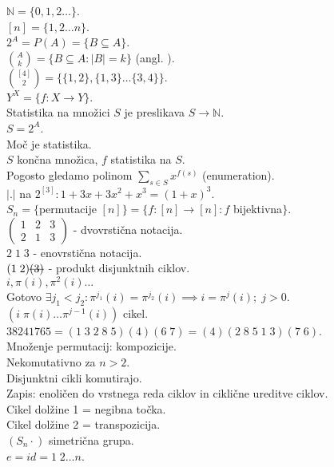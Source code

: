 \documentclass[a4paper, 12pt]{book}
\newcommand{\msout}[1]{\text{\sout{\ensuremath{#1}}}}
\theoremstyle{definition}
\theoremstyle{remark}
\newcommand{\N}{\mathbb{N}}
\begin{document}
$\N = \{0, 1, 2 \dots\}$. \\
$[n] = \{1, 2 \dots n\}$. \\
$2^A = P(A) = \{B \subseteq A\}$. \\
$\binom{A}{k} = \{B \subseteq A: |B| = k\}$  (angl. ). \\
$\binom{[4]}{2} = \{\{1,2\}, \{1,3\} \dots \{3,4\}\}$. \\
$Y^X = \{f: X \to Y\}$. \\
Statistika na množici $S$ je preslikava $S \to \N$. \\
$S = 2^A$. \\
Moč je statistika. \\
$S$ končna množica, $f$ statistika na $S$. \\
Pogosto gledamo polinom $\sum_{s \in S} x^{f(s)}$ (enumeration). \\
$|.|$ na $2^{[3]}: 1 + 3 x + 3 x^2 + x^3 = (1+x)^3$. \\
$S_n = \{$permutacije $[n]\} = \{f: [n] \to [n]: f $ bijektivna$\}$. \\
$\begin{pmatrix}1 & 2 & 3 \\ 2 & 1 & 3\end{pmatrix}$ - dvovrstična notacija. \\
$2 \; 1 \; 3$ - enovrstična notacija. \\
$(1 \; 2) \msout{(3)}$ - produkt disjunktnih ciklov. \\
$i, \pi(i), \pi^2(i) \dots$ \\
Gotovo $\exists j_1 < j_2: \pi^{j_1}(i) = \pi^{j_2}(i) \implies i = \pi^j(i); \; j > 0$. \\
$(i \; \pi(i) \dots \pi^{j-1}(i))$ cikel. \\
$38241765 = (1 \; 3 \; 2 \; 8 \; 5) (4) (6 \; 7) = (4) (2 \; 8 \; 5 \; 1 \; 3) (7 \; 6)$. \\
Množenje permutacij: kompozicije. \\
Nekomutativno za $n > 2$. \\
Disjunktni cikli komutirajo. \\
Zapis: enoličen do vrstnega reda ciklov in ciklične ureditve ciklov. \\
Cikel dolžine 1 = negibna točka. \\
Cikel dolžine 2 = transpozicija. \\
$(S_n \cdot)$ simetrična grupa. \\
$e = id = 1 \; 2 \dots n$. \\
\end{document}
